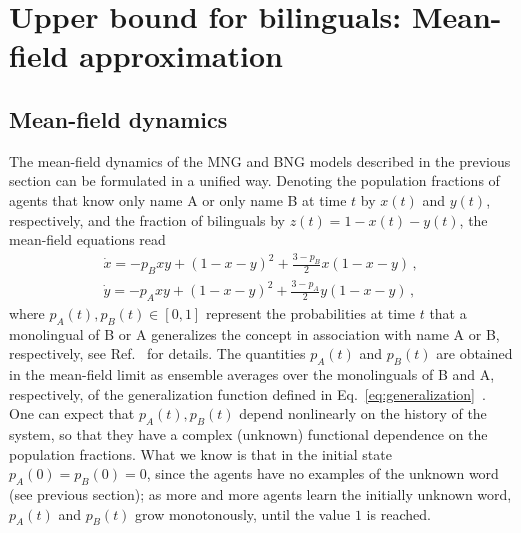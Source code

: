 \documentclass[review]{elsarticle}
\newcommand{\+}{\! + \!}
\begin{document}

\section{Upper bound for bilinguals: Mean-field approximation} 
\label{sec:consideration}


\subsection{Mean-field dynamics}
\label{sec:meanfield}

The mean-field dynamics of the MNG and BNG models described in the previous section can be formulated in a unified way. 
Denoting the population fractions of agents that know only name A or only name B at time $t$ by $x(t)$ and $y(t)$,  respectively, and the fraction of bilinguals by $z(t) = 1 - x(t) - y(t)$, the mean-field equations read~\cite{Marchetti-2020a}
% 
\begin{align}
  \dot{x} = - p_B x y + \left(1- x - y \right) ^{2} + \frac{3 - p_B}{2} x \left(1- x - y \right)  \, , \label{eq:autonomous1a}\\  %
  \dot{y} = - p_A x y +  \left(1- x - y \right)^{2} +  \frac{3 - p_A}{2} y \left(1- x - y \right) \label{eq:autonomous1b} \, ,
\end{align}
%
where $p_A(t), p_B(t) \!\in\! [0,1]$ represent the probabilities at time $t$ that a monolingual of B or A generalizes the concept in association with name A or B, respectively, see Ref.~\cite{Marchetti-2020a} for details.
The quantities $p_A(t)$ and $p_B(t)$ are obtained in the mean-field limit as ensemble averages over the monolinguals of B and A, respectively, of the generalization function defined in Eq.~\eqref{eq:generalization}~\cite{Marchetti-2020a}.
One can expect that $p_A(t), p_B(t)$ depend nonlinearly on the history of the system, so that they have a complex (unknown) functional dependence on the population fractions.
What we know is that in the initial state $p_A(0) = p_B(0) = 0$, since the agents have no examples of the unknown word (see previous section);
as more and more agents learn the initially unknown word, $p_A(t)$ and $p_B(t)$ grow monotonously, until the value $1$ is reached.
\end{document}
